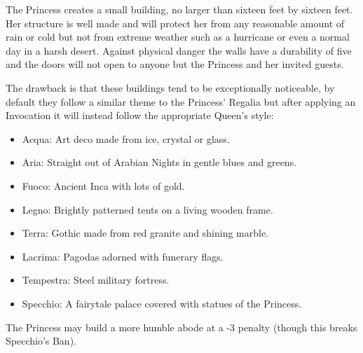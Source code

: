 The Princess creates a small building, no larger than sixteen feet by sixteen feet. Her structure is well made and will protect her from any reasonable amount of rain or cold but not from extreme weather such as a hurricane or even a normal day in a harsh desert. Against physical danger the walls have a durability of five and the doors will not open to anyone but the Princess and her invited guests.

The drawback is that these buildings tend to be exceptionally noticeable, by default they follow a similar theme to the Princess' Regalia but after applying an Invocation it will instead follow the appropriate Queen's style:

\begin{itemize}
 \item Acqua: Art deco made from ice, crystal or glass.
 \item Aria: Straight out of Arabian Nights in gentle blues and greens.
 \item Fuoco: Ancient Inca with lots of gold.
 \item Legno: Brightly patterned tents on a living wooden frame.
 \item Terra: Gothic made from red granite and shining marble.
 \item Lacrima: Pagodas adorned with funerary flags.
 \item Tempestra: Steel military fortress.
 \item Specchio: A fairytale palace covered with statues of the Princess.\end{itemize}

The Princess may build a more humble abode at a -3 penalty (though this breaks Specchio's Ban).

